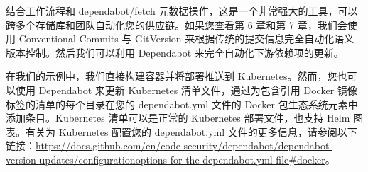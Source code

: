 结合工作流程和 dependabot/fetch 元数据操作，这是一个非常强大的工具，可以跨多个存储库和团队自动化您的供应链。如果您查看第 6 章和第 7 章，我们会使用 Conventional Commits 与 GitVersion 来根据传统的提交信息完全自动化语义版本控制。然后我们可以利用 Dependabot 来完全自动化下游依赖项的更新。


在我们的示例中，我们直接构建容器并将部署推送到 Kubernetes。然而，您也可以使用 Dependabot 来更新 Kubernetes 清单文件，通过为包含引用 Docker 镜像标签的清单的每个目录在您的 dependabot.yml 文件的 Docker 包生态系统元素中添加条目。Kubernetes 清单可以是正常的 Kubernetes 部署文件，也支持 Helm 图表。有关为 Kubernetes 配置您的 dependabot.yml 文件的更多信息，请参阅以下链接：\url{https://docs.github.com/en/code-security/dependabot/dependabot-version-updates/configurationoptions-for-the-dependabot.yml-file#docker}。